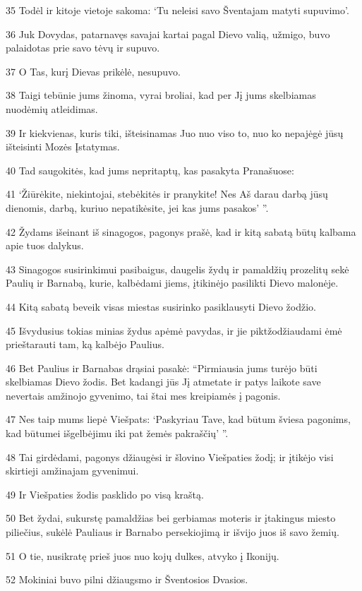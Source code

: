 \par 35 Todėl ir kitoje vietoje sakoma: ‘Tu neleisi savo Šventajam matyti supuvimo’. 
\par 36 Juk Dovydas, patarnavęs savajai kartai pagal Dievo valią, užmigo, buvo palaidotas prie savo tėvų ir supuvo. 
\par 37 O Tas, kurį Dievas prikėlė, nesupuvo. 
\par 38 Taigi tebūnie jums žinoma, vyrai broliai, kad per Jį jums skelbiamas nuodėmių atleidimas. 
\par 39 Ir kiekvienas, kuris tiki, išteisinamas Juo nuo viso to, nuo ko nepajėgė jūsų išteisinti Mozės Įstatymas. 
\par 40 Tad saugokitės, kad jums nepritaptų, kas pasakyta Pranašuose: 
\par 41 ‘Žiūrėkite, niekintojai, stebėkitės ir pranykite! Nes Aš darau darbą jūsų dienomis, darbą, kuriuo nepatikėsite, jei kas jums pasakos’ ”. 
\par 42 Žydams išeinant iš sinagogos, pagonys prašė, kad ir kitą sabatą būtų kalbama apie tuos dalykus. 
\par 43 Sinagogos susirinkimui pasibaigus, daugelis žydų ir pamaldžių prozelitų sekė Paulių ir Barnabą, kurie, kalbėdami jiems, įtikinėjo pasilikti Dievo malonėje. 
\par 44 Kitą sabatą beveik visas miestas susirinko pasiklausyti Dievo žodžio. 
\par 45 Išvydusius tokias minias žydus apėmė pavydas, ir jie piktžodžiaudami ėmė prieštarauti tam, ką kalbėjo Paulius. 
\par 46 Bet Paulius ir Barnabas drąsiai pasakė: “Pirmiausia jums turėjo būti skelbiamas Dievo žodis. Bet kadangi jūs Jį atmetate ir patys laikote save nevertais amžinojo gyvenimo, tai štai mes kreipiamės į pagonis. 
\par 47 Nes taip mums liepė Viešpats: ‘Paskyriau Tave, kad būtum šviesa pagonims, kad būtumei išgelbėjimu iki pat žemės pakraščių’ ”. 
\par 48 Tai girdėdami, pagonys džiaugėsi ir šlovino Viešpaties žodį; ir įtikėjo visi skirtieji amžinajam gyvenimui. 
\par 49 Ir Viešpaties žodis pasklido po visą kraštą. 
\par 50 Bet žydai, sukurstę pamaldžias bei gerbiamas moteris ir įtakingus miesto piliečius, sukėlė Pauliaus ir Barnabo persekiojimą ir išvijo juos iš savo žemių. 
\par 51 O tie, nusikratę prieš juos nuo kojų dulkes, atvyko į Ikonijų. 
\par 52 Mokiniai buvo pilni džiaugsmo ir Šventosios Dvasios.


